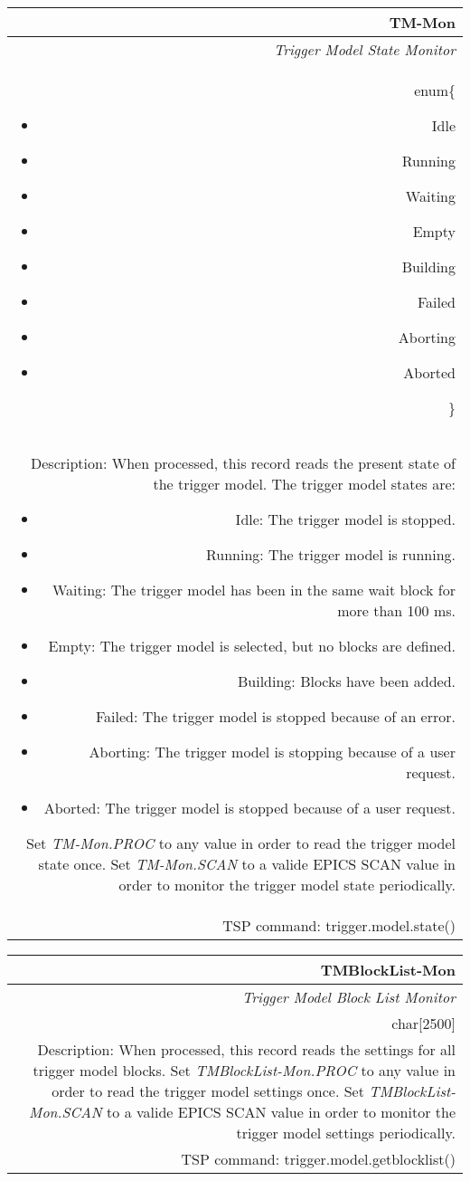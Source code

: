 \documentclass[openany]{article}
\begin{document}
		\begin{tabular}{N}
			\hline
			\bfseries TM-Mon\label{pv:tm-mon} \\ \hline
			\emph{Trigger Model State Monitor} \\
			enum\{\begin{itemize}[noitemsep]
				\small
				\item[] Idle
				\item[] Running
				\item[] Waiting
				\item[] Empty
				\item[] Building
				\item[] Failed
				\item[] Aborting
				\item[] Aborted
			\end{itemize}\} \\
			Description: When processed, this record reads the present state of the trigger model. The trigger model states are: \begin{itemize} \item Idle: The trigger model is stopped. \item Running: The trigger model is running. \item Waiting: The trigger model has been in the same wait block for more than 100 ms. \item Empty: The trigger model is selected, but no blocks are defined. \item Building: Blocks have been added. \item Failed: The trigger model is stopped because of an error. \item Aborting: The trigger model is stopping because of a user request. \item Aborted: The trigger model is stopped because of a user request. \end{itemize} Set \emph{TM-Mon.PROC} to any value in order to read the trigger model state once. Set \emph{TM-Mon.SCAN} to a valide EPICS SCAN value in order to monitor the trigger model state periodically. \\
			TSP command: trigger.model.state()
		\end{tabular}

		\begin{tabular}{N}
			\hline
			\bfseries TMBlockList-Mon\label{pv:tmblocklist-mon} \\ \hline
			\emph{Trigger Model Block List Monitor} \\
			char[2500] \\
			Description: When processed, this record reads the settings for all trigger model blocks. Set \emph{TMBlockList-Mon.PROC} to any value in order to read the trigger model settings once. Set \emph{TMBlockList-Mon.SCAN} to a valide EPICS SCAN value in order to monitor the trigger model settings periodically. \\
			TSP command: trigger.model.getblocklist()
		\end{tabular}
\end{document}
